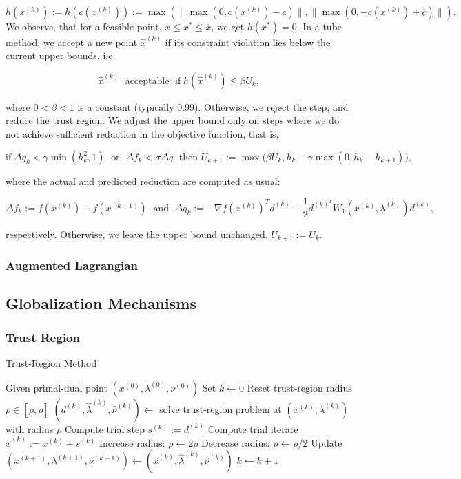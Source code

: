\[
h(x^{(k)}) := h(c(x^{(k)})) := \max \left( \bigg\lVert \max\left(0, c(x^{(k)}) - \underline{c}\right) \bigg\rVert ,
                                            \bigg\lVert \max\left(0, -c(x^{(k)}) + \overline{c}\right) \bigg\rVert \right) .
\]
We observe, that for a feasible point, $\underline{x} \leq x^* \leq \overline{x}$, we get $h(x^*) = 0$. In a
tube method, we accept a new point $\hat{x}^{(k)}$ if its constraint violation lies below the current upper bounds, i.e.

\[
\hat{x}^{(k)} \; \text{ acceptable } \; \text{if} \; h(\hat{x}^{(k)}) \leq \beta U_k,
\]

where $0 < \beta < 1$ is a constant (typically 0.99). Otherwise, we reject the step, and reduce the trust region.
We adjust the upper bound only on steps where we do not achieve sufficient reduction in the objective
function, that is,

\[
\text{if} \; \Delta q_k < \gamma \min(h_k^2,1) \; \text{ or } \; \Delta f_k < \sigma \Delta q
   \; \text{ then } U_{k+1} := \max \bigg(\beta U_k, h_k -\gamma \max(0, h_k - h_{k+1}) \bigg),
\]
   
where the actual and predicted reduction are computed as usual:

\[
\Delta f_k := f(x^{(k)}) - f(x^{(k+1)}) \; \text{ and } \;
\Delta q_k := -  \nabla f (x^{(k)})^T d^{(k)} - \frac{1}{2} d^{(k)^T} W_1(x^{(k)}, \lambda^{(k)}) d^{(k)},
\]

respectively. Otherwise, we leave the upper bound unchanged, $U_{k+1} := U_k$.

\subsubsection{Augmented Lagrangian}

\subsection{Globalization Mechanisms}

\subsubsection{Trust Region}

\begin{algorithm}[h!]
\caption{Trust-Region Method}
\SetAlgoVlined
Given primal-dual point $(x^{(0)}, \lambda^{(0)}, \nu^{(0)})$ \;
Set $k \gets 0$ \;
 {
	Reset trust-region radius $\rho \in [\underline{\rho}, \overline{\rho}]$ \;
	 {
		$(d^{(k)}, \hat{\lambda}^{(k)}, \hat{\nu}^{(k)}) \gets$ solve trust-region problem at $(x^{(k)}, \lambda^{(k)})$ with radius $\rho$ \;
		Compute trial step $s^{(k)} := d^{(k)}$ \;
		Compute trial iterate $\hat{x}^{(k)} := x^{(k)} + s^{(k)}$ \;
		 {
			 {
				Increase radius: $\rho \gets 2 \rho$ \;
			}
		}{
			Decrease radius: $\rho \gets \rho/2$ \;
		}
	}
	Update $(x^{(k+1)}, \lambda^{(k+1)}, \nu^{(k+1)}) \gets (\hat{x}^{(k)}, \hat{\lambda}^{(k)}, \hat{\nu}^{(k)})$ \;
	$k \gets k+1$ \;
}
\end{algorithm}

